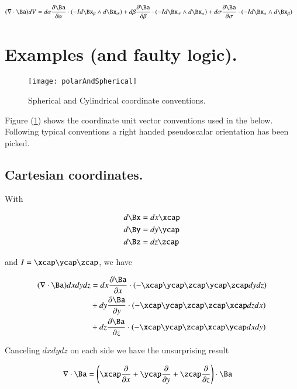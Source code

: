 \begin{align}\label{eqn:divergenceForm}
(\grad \cdot \Ba ) dV &=
 d\alpha \PD{\alpha}{\Ba} \cdot (-I d\Bx_\beta \wedge d\Bx_\sigma)
+d\beta \PD{\beta}{\Ba} \cdot (-I d\Bx_\sigma \wedge d\Bx_\alpha)
+d\sigma \PD{\sigma}{\Ba} \cdot (-I d\Bx_\alpha \wedge d\Bx_\beta)
\end{align}

\section{Examples (and faulty logic).}

\begin{figure}[htp]
\centering
\texttt{[image: polarAndSpherical]}
\caption{Spherical and Cylindrical coordinate conventions.}\label{fig:polarAndSpherical}
\end{figure}

Figure (\ref{fig:polarAndSpherical}) shows the coordinate unit vector conventions used in the below.  Following typical conventions a right handed pseudoscalar orientation has been picked.

\subsection{Cartesian coordinates.}

With

\begin{align*}
d\Bx &= dx \xcap \\
d\By &= dy \ycap \\
d\Bz &= dz \zcap
\end{align*}

and $I = \xcap \ycap \zcap$, we have

\begin{align*}
(\grad \cdot \Ba ) dx dy dz &=
 dx \PD{x}{\Ba} \cdot (-\xcap \ycap \zcap \ycap \zcap dy dz )  \\
&+dy \PD{y}{\Ba} \cdot (-\xcap \ycap \zcap \zcap \xcap dz dx )  \\
&+dz \PD{z}{\Ba} \cdot (-\xcap \ycap \zcap \xcap \ycap dx dy )
\end{align*}

Canceling $dx dy dz$ on each side we have the unsurprising result

\begin{align}\label{eqn:cartesianGradDot}
\grad \cdot \Ba &=
\left(\xcap \PD{x}{}
+\ycap \PD{y}{}
+\zcap \PD{z}{} \right) \cdot \Ba
\end{align}

